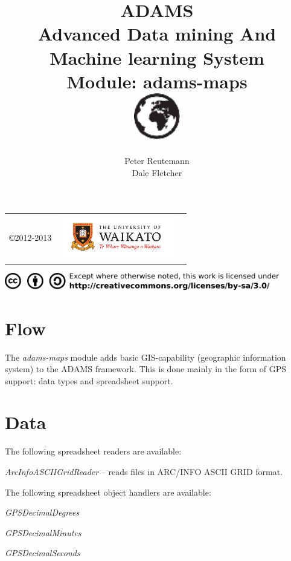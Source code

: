 \documentclass[a4paper]{book}
\title{
  \textbf{ADAMS} \\
  {\Large \textbf{A}dvanced \textbf{D}ata mining \textbf{A}nd \textbf{M}achine
  learning \textbf{S}ystem} \\
  {\Large Module: adams-maps} \\
  \vspace{1cm}
  \includegraphics[width=2cm]{images/maps-module.png} \\
}
\author{
  Peter Reutemann \\
  Dale Fletcher
}
\begin{document}
\begin{titlepage}
\maketitle

\thispagestyle{empty}
\center
\begin{table}[b]
	\begin{tabular}{c l l}
		\parbox[c][2cm]{2cm}{\copyright 2012-2013} &
		\parbox[c][2cm]{5cm}{\includegraphics[width=5cm]{images/coat_of_arms.pdf}}
	\end{tabular}
	\includegraphics[width=12cm]{images/cc.png} \\
\end{table}

\end{titlepage}

\tableofcontents

\chapter{Flow}

The \textit{adams-maps} module adds basic GIS-capability (geographic
information system) to the ADAMS framework. This is done mainly in the
form of GPS support: data types and spreadsheet support.


\chapter{Data}

The following spreadsheet readers are available:
\begin{tight_itemize}
	\item \textit{ArcInfoASCIIGridReader} -- reads files in
	ARC/INFO ASCII GRID format\cite{esrigrid}.
\end{tight_itemize}

\noindent The following spreadsheet object handlers are available:
\begin{tight_itemize}
	\item \textit{GPSDecimalDegrees}
	\item \textit{GPSDecimalMinutes}
	\item \textit{GPSDecimalSeconds}
\end{tight_itemize}
\end{document}
